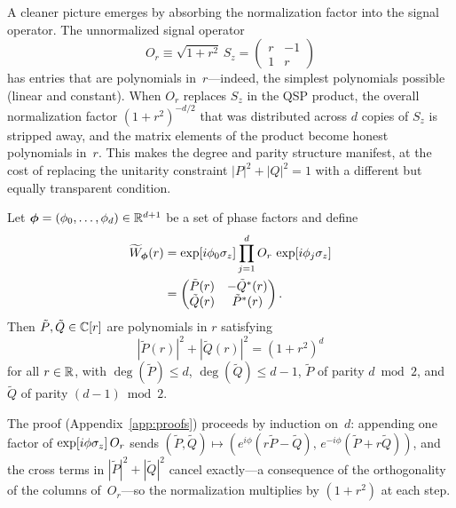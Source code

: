 A cleaner picture emerges by absorbing the normalization
factor into the signal operator.  The unnormalized signal
operator
\begin{equation}
	O_r \equiv \sqrt{1+r^2}\,S_z =
	\begin{pmatrix} r & -1 \\ 1 & r \end{pmatrix}
	\label{eq:unnormalized-signal}
\end{equation}
has entries that are polynomials in~$r$---indeed, the simplest
polynomials possible (linear and constant).  When $O_r$
replaces $S_z$ in the QSP product, the overall normalization
factor $(1+r^2)^{-d/2}$ that was distributed across $d$
copies of $S_z$ is stripped away, and the matrix elements of
the product become honest polynomials in~$r$.  This makes the
degree and parity structure manifest, at the cost of replacing
the unitarity constraint $|P|^2+|Q|^2 = 1$ with a different
but equally transparent condition.

\begin{theorem}
	\label{thm:unnormalized}
	Let $\bm{\phi} = (\phi_0, \ldots, \phi_d) \in \mathbb{R}^{d+1}$ be a set of phase factors and define
	\begin{align}
		\widetilde{W}_{\bm{\phi}}(r) & = \exp[i\phi_0\sigma_z]\prod_{j=1}^{d} O_r\, \exp[i\phi_j\sigma_z] \nonumber                       \\
		                             & = \begin{pmatrix} \tilde{P}(r) & -\tilde{Q}^*(r) \\ \tilde{Q}(r) & \tilde{P}^*(r) \end{pmatrix}.
	\end{align}
	Then $\tilde{P}, \tilde{Q} \in \mathbb{C}[r]$ are polynomials in $r$ satisfying
	\begin{equation}
		|\tilde{P}(r)|^2 + |\tilde{Q}(r)|^2 = (1+r^2)^d
		\label{eq:unnormalized-norm}
	\end{equation}
	for all $r \in \mathbb{R}$, with $\deg(\tilde{P}) \leq d$, $\deg(\tilde{Q}) \leq d-1$, $\tilde{P}$ of parity $d \bmod 2$, and $\tilde{Q}$ of parity $(d-1) \bmod 2$.
\end{theorem}

The proof (Appendix~\ref{app:proofs}) proceeds by induction on~$d$:
appending one factor of $\exp[i\phi\sigma_z]\,O_r$ sends
$(\tilde{P},\tilde{Q}) \mapsto (e^{i\phi}(r\tilde{P}-\tilde{Q}),\,
	e^{-i\phi}(\tilde{P}+r\tilde{Q}))$, and the cross terms in
$|\widetilde{P}|^2 + |\widetilde{Q}|^2$ cancel exactly---a
consequence of the orthogonality of the columns of~$O_r$---so
the normalization multiplies by $(1+r^2)$ at each step.

